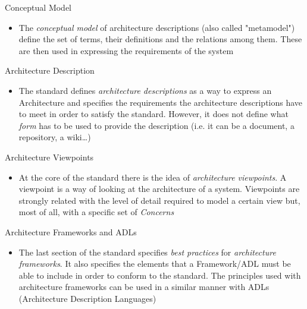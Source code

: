 		\begin{frame}
			
		\vspace{0.3cm}
		
			\begin{block}{Conceptual Model}
				\begin{itemize}
					\item The \emph{conceptual model} of architecture descriptions (also called "metamodel") define the set of terms, their definitions and the relations among them. These are then used in expressing the requirements of the system
				\end{itemize}
			\end{block}				
			
\vspace{0.3cm}			
			
			\begin{block}{Architecture Description}
				\begin{itemize}
					\item The standard defines \emph{architecture descriptions} as a way to express an Architecture and specifies the requirements the architecture descriptions have to meet in order to satisfy the standard. However, it does not define what \emph{form} has to be used to provide the description (i.e. it can be a document, a repository, a wiki\dots)
				\end{itemize}
			\end{block}
		\end{frame}
		
		\begin{frame}					
			
			\begin{block}{Architecture Viewpoints}
			\begin{itemize}
				\item At the core of the standard there is the idea of \emph{architecture viewpoints}. A viewpoint is a way of looking at the architecture of a system. Viewpoints are strongly related with the level of detail required to model a certain view but, most of all, with a specific set of \emph{Concerns}
				\end{itemize}
			\end{block}
				
			\begin{block}{Architecture Frameworks and ADLs}
				\begin{itemize}
					\item The last section of the standard specifies \emph{best practices} for \emph{architecture frameworks}.\newline
					It also specifies the elements that a Framework/ADL must be able to include in order to conform to the standard.\newline
					The principles used with architecture frameworks can be used in a similar manner with ADLs (Architecture Description Languages)
				\end{itemize}
			
			\end{block}
		\end{frame}
		

